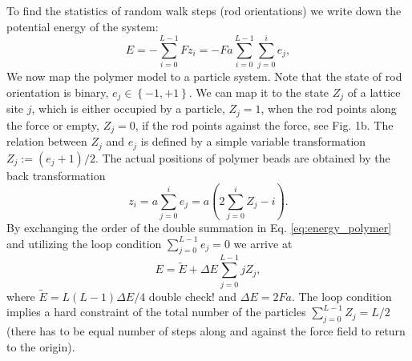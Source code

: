 \documentclass[aps,showpacs,twocolumn,floatfix,prx,superscriptaddress]{revtex4-1}
\begin{document}
To find the statistics of random walk steps (rod orientations) we write down the potential energy of the system:
\begin{equation}
    \label{eq:energy_polymer}
    E  = -\sum_{i=0}^{L-1} {Fz_i} = -Fa\sum_{i=0}^{L-1} \sum_{j=0}^{i}e_j, 
\end{equation}
We now map the polymer model to a particle system. Note that the state of rod orientation is binary, $e_j \in \left\{-1, +1\right\}$. We can map it to the state $Z_j$ of a lattice site $j$, which is either occupied by a particle, $Z_j = 1$, when the rod points along the force or empty, $Z_j = 0$, if the rod points against the force, see Fig. 1b. The relation between $Z_j$ and $e_j$ is defined by a simple variable transformation $Z_j := \left(e_j+1\right)/2$. The actual positions of polymer beads are obtained by the back transformation
\begin{equation}
    \label{eq:z2x}
    z_i = a \sum_{j=0}^{i}{e_j} = a\left(2\sum_{j=0}^{i}{Z_j} -i\right).
\end{equation}
By exchanging the order of the double summation in Eq.  \eqref{eq:energy_polymer} and utilizing the loop condition  $\sum_{j=0}^{L-1} e_j = 0$ we arrive at 
\begin{equation}
    \label{eq:energy_particle}
    E = \tilde{E} + \Delta E \sum_{j=0}^{L-1} j Z_j, 
\end{equation}
where $\tilde{E}= L(L-1) \Delta E /4$ {\color{red} double check!} and $\Delta E = 2Fa$. The loop condition implies a hard constraint of the total number of the particles $\sum_{j=0}^{L-1} Z_j = L/2$ (there has to be equal number of steps along and against the force field to return to the origin).
\end{document}
